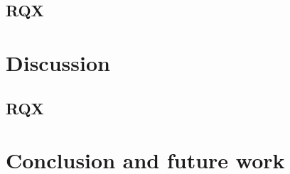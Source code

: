 \documentclass[conference]{IEEEtran}
\begin{document}
\subsection{RQX}

\section{Discussion}
\label{sec:disc}

\subsection{RQX}

\section{Conclusion and future work}
\label{sec:conc}



\end{document}
